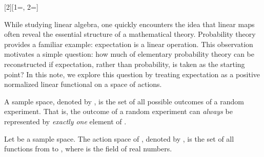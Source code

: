 \newcommand{\sampleSetAlt}[1][s']{\set{#1}}
\newcommand{\actionSet}[1][\sampleSet]{\mathFix{\mathcal{A}_{#1}}}
\newcommand{\rstActionSet}[1][]{\actionSet[{\sampleSet \cap \event[{#1}]}]}
\newcommand{\actionSetAlt}{\actionSet[s']}
\newcommand{\rstOp}[1][\event]{\mathFix{R_{\cap #1}}}
\newcommand{\act}[1][\sampleSet]{\mathFix{\ell_{#1}}}
\newcommand{\rstAct}[1][\event]{\act[{\cap #1}]}
\newcommand{\F}[1][]{\mathFix{\functional[F]{#1}}}
\newcommand{\G}[1][]{\mathFix{\functional[G]{#1}}}
[2][1=, 2=\sampleSet]{}
\newcommand{\ExpAlt}[1][]{\Expect[{#1}][\sampleSetAlt]}
\newcommand{\ExpectOnE}[1][]{\mathFix{\Ex{\sampleSet \mid \event}{#1}}}
\newcommand{\event}[1][]{\mathFix{\set{e}_{#1}}}
\newcommand{\eventAlt}{\set{e}'}
\newcommand{\eventInS}{\mathFix{\event \subseteq \sampleSet}}
\newcommand{\inA}[1]{\mathFix{#1 \in \actionSet}}
\newcommand{\inS}{\mathFix{s \in \set{s}}}

\newcommand{\actAlt}[1][\cap \event']{\mathFix{\ell'_{#1}}}
\newcommand{\sure}[1][\sampleSet]{\mathFix{c_{#1}}}
\newcommand{\sureAlt}{\sure[\sampleSetAlt]}

\newcommand{\mapsDual}[2]{\maps[{\dualMap}]{\field{R}^{#1}}{\field{R}^{#2}}}
\newcommand{\dualdualMap}[1][M]{\mathFix{{#1}^{**}}}
\newcommand{\dualMap}[1][M]{\mathFix{{#1}^*}}

While studying linear algebra, one quickly encounters the idea that linear maps often reveal the essential structure
of a mathematical theory.
Probability theory provides a familiar example: expectation is a linear operation.
This observation motivates a simple question: how much of elementary probability theory can be reconstructed if
expectation, rather than probability, is taken as the starting point?
In this note, we explore this question by treating expectation as a positive normalized linear functional on a space
of actions.

\begin{definition} 
    A sample space, denoted by \sampleSet, is the set of all possible outcomes of a random experiment.
    That is, the outcome of a random experiment can \emph{always} be represented by \emph{exactly one} element of \sampleSet.
\end{definition}

\begin{definition} 
    Let \sampleSet be a sample space.
    The action space of \sampleSet, denoted by \actionSet, is the set of all functions from \sampleSet to , where 
    is the field of real numbers.
\end{definition}

